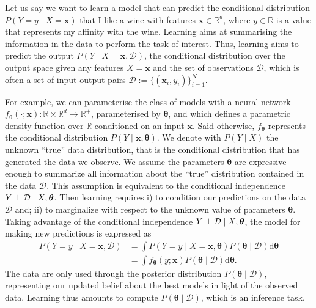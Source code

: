 Let us say we want to learn a model that can predict the conditional distribution $P(Y=y\mid X=\bm{x})$ that I like a wine with features $\bm{x} \in \mathbb{R}^d$, where $y \in \mathbb{R}$ is a value that represents my affinity with the wine. Learning aims at summarising the information in the data to perform the task of interest. Thus, learning aims to predict the output $P(Y \mid X=\mathbf{x}, \mathcal{D})$, the conditional distribution over the output space given any features $X=\bm{x}$ and the set of observations $\mathcal{D}$, which is often a set of input-output pairs  $\mathcal{D}:= \{(\mathbf{x}_i, y_i)\}_{i=1}^N$.

For example, we can parameterise the class of models with a neural network $f_{\bm \theta}(\cdot; \bm{ x}): \mathbb{R} \times \mathbb{R}^{d} \rightarrow \mathbb{R}^+$, parameterised by $\bm{\theta}$, and which defines a parametric density function over $\mathbb{R}$ conditioned on an input $\bm{x}$. Said otherwise, $f_{\bm{\theta}}$ represents the conditional distribution $P(Y \mid \bm{x}, \bm{\theta})$. We denote with $P(Y\mid X)$ the unknown ``true'' data distribution, that is the conditional distribution that has generated the data we observe.
We assume the parameters $\bm{\theta}$ are expressive enough to summarize all information about the ``true'' distribution contained in the data $\mathcal{D}$. This assumption is equivalent to the conditional independence $ Y \perp \mathcal{D} \mid X, \bm \theta$. Then learning requires i) to condition our predictions on the data $\mathcal{D}$ and; ii) to marginalize with respect to the unknown value of parameters $\bm \theta$. Taking advantage of the conditional independence $ Y \perp \mathcal{D} \mid X, \bm \theta$, the model for making new predictions is expressed as
\begin{align}
  P(Y=y\mid X=\bm x, \mathcal{D}) &= \int P(Y=y\mid X=\bm x, \bm \theta) P(\bm \theta \mid \mathcal{D}) \text{d}\bm{\theta}\\
  &=\int f_{\bm \theta}(y; \bm x) P(\bm \theta \mid  \mathcal{D}) \text{d}\bm{\theta}.
\end{align}
The data are only used through the posterior distribution $P(\bm \theta  \mid  \mathcal{D})$, representing our updated belief about the best models in light of the observed data. Learning thus amounts to compute $P(\bm \theta \mid \mathcal{D})$, which is an inference task.

